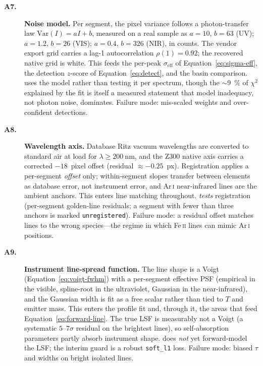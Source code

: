 \begin{description}
\item[\textbf{A7.}] \textbf{Noise model.}
Per segment, the pixel variance follows a photon-transfer law
\citep{janesick2007photontransfer} $\mathrm{Var}(I) = aI + b$, measured on a real sample as $a=10,\,b=63$ (UV);
$a=1.2,\,b=26$ (VIS); $a=0.4,\,b=326$ (NIR), in counts. The vendor export grid carries
a lag-1 autocorrelation $\rho(1)=0.92$; the recovered native grid is white. This feeds
the per-peak $\sigma_{\mathrm{eff}}$ of Equation~\eqref{eq:sigma-eff}, the detection
$z$-score of Equation~\eqref{eq:detect}, and the basin comparison. \alibz{} uses the
model rather than testing it per spectrum, though the $\sim$\SI{9}{\percent} of
$\chi^2$ explained by the fit is itself a measured statement that model inadequacy, not
photon noise, dominates. Failure mode: mis-scaled weights and over-confident detections.

\item[\textbf{A8.}] \textbf{Wavelength axis.}
Database Ritz vacuum wavelengths are converted to standard air
\citep{edlen1966refractive,birch1994refractive} at load for
$\lambda\ge\SI{200}{\nano\meter}$, and the Z300 native axis carries a corrected
$-18$~pixel offset (residual $\approx-0.25$~px). Registration applies a per-segment
\emph{offset} only; within-segment slopes transfer between elements as database error,
not instrument error, and Ar\,\textsc{i} near-infrared lines are the ambient anchors.
This enters line matching throughout. \alibz{} \emph{tests} registration (per-segment
golden-line residuals; a segment with fewer than three anchors is marked
\texttt{unregistered}). Failure mode: a residual offset matches lines to the wrong
species---the regime in which Fe\,\textsc{ii} lines can mimic Ar\,\textsc{i} positions.

\item[\textbf{A9.}] \textbf{Instrument line-spread function.}
The line shape is a Voigt (Equation~\eqref{eq:voigt-fwhm}) with a per-segment effective
PSF (empirical in the visible, spline-root in the ultraviolet, Gaussian in the
near-infrared), and the Gaussian width is fit as a free scalar rather than tied to $T$
and emitter mass. This enters the profile fit and, through it, the areas that feed
Equation~\eqref{eq:forward-line}. The true LSF is measurably not a Voigt (a systematic
$5$--$7\sigma$ residual on the brightest lines), so self-absorption parameters partly
absorb instrument shape. \alibz{} does \emph{not} yet forward-model the LSF; the
interim guard is a robust \texttt{soft\_l1} loss. Failure mode: biased $\tau$ and
widths on bright isolated lines.


\end{description}
